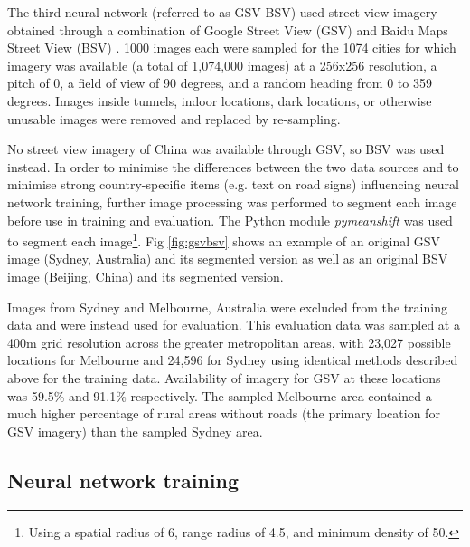 \documentclass[10pt,letterpaper,hidelinks]{article}
\begin{document}
The third neural network (referred to as GSV-BSV) used street view imagery obtained through a combination of Google Street View (GSV) \cite{GoogleMaps2017b} and Baidu Maps Street View (BSV) \cite{Baidu2017}. 1000 images each were sampled for the 1074 cities for which imagery was available (a total of 1,074,000 images) at a 256x256 resolution, a pitch of 0, a field of view of 90 degrees, and a random heading from 0 to 359 degrees. Images inside tunnels, indoor locations, dark locations, or otherwise unusable images were removed and replaced by re-sampling.

No street view imagery of China was available through GSV, so BSV was used instead.  In order to minimise the differences between the two data sources and to minimise strong country-specific items (e.g. text on road signs) influencing neural network training, further image processing was performed to segment each image before use in training and evaluation. The Python module \textit{pymeanshift} \cite{Pymeanshift2017} was used to segment each image\footnote{Using a spatial radius of 6, range radius of 4.5, and minimum density of 50.}. Fig \ref{fig:gsvbsv} shows an example of an original GSV image (Sydney, Australia) and its segmented version as well as an original BSV image (Beijing, China) and its segmented version.


Images from Sydney and Melbourne, Australia were excluded from the training data and were instead used for evaluation. This evaluation data was sampled at a 400m grid resolution across the greater metropolitan areas, with 23,027 possible locations for Melbourne and 24,596 for Sydney using identical methods described above for the training data. Availability of imagery for GSV at these locations was 59.5\% and 91.1\% respectively. The sampled Melbourne area contained a much higher percentage of rural areas without roads (the primary location for GSV imagery) than the sampled Sydney area.


\subsection*{Neural network training}\label{sec:methods4}    
\end{document}
